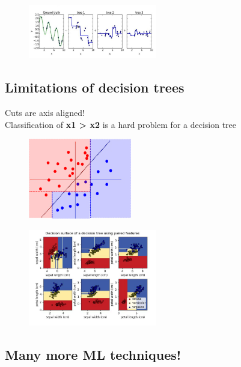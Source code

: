 \begin{figure}[ht]
	\centering
	\includegraphics[width=0.5\textwidth]{figure_ml/g_b2.png}
\end{figure}
\FloatBarrier

\subsection{Limitations of decision trees}
Cuts are axis aligned!\\
Classification of \textbf{x1 > x2} is a hard problem for a decision tree

\begin{figure}[ht]
	\centering
	\includegraphics[width=0.4\textwidth]{figure_ml/limitations_trees.png}
\end{figure}
\FloatBarrier

\begin{figure}[ht]
	\centering
	\includegraphics[width=0.5\textwidth]{figure_ml/limitations_trees2.png}
\end{figure}
\FloatBarrier

\subsection{Many more ML techniques!}

